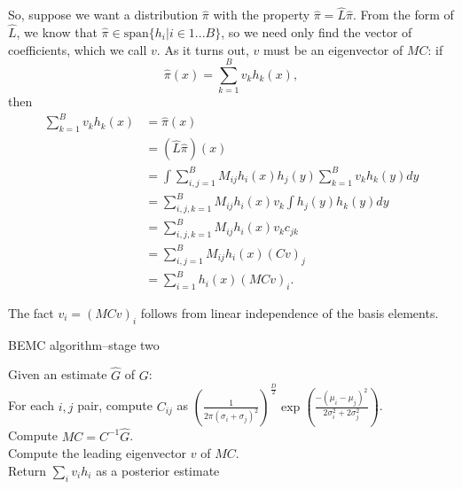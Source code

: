 \documentclass{article}
\newcommand\EMK[1]{\textcolor{purple}{EMK: #1}}
\begin{document}
So, suppose we want a distribution $\hat{\pi}$ with the property $\hat{\pi}=\hat{L}\hat{\pi}$. From the form of $\hat{L}$, we know that $\hat{\pi}\in \text{span}\{h_i|i \in 1...B\}$, so we need only find the vector of coefficients, which we call $v$. As it turns out, $v$ must be an eigenvector of $MC$: if $$\hat{\pi}(x) = \sum_{k=1}^Bv_kh_k(x),$$
then
\begin{align*}
\sum_{k=1}^Bv_kh_k(x) 
&= \hat{\pi}(x) \\
&= (\hat{L}\hat{\pi})(x) \\
&= \int \sum_{i,j=1}^B M_{ij} h_i(x)h_j(y) \sum_{k=1}^Bv_kh_k(y)dy\\
&=  \sum_{i,j,k=1}^B M_{ij} h_i(x)v_k\int h_j(y)h_k(y)dy\\
&=  \sum_{i,j,k=1}^B M_{ij} h_i(x)v_kc_{jk}\\
&=  \sum_{i,j=1}^B M_{ij} h_i(x)(Cv)_j\\
&=  \sum_{i=1}^B h_i(x)(MCv)_i.
\end{align*}

The fact $v_i = (MCv)_i$ follows from linear independence of the basis elements.



\begin{algorithm}[h]
\caption{BEMC algorithm--stage two}
Given an estimate $\hat{G}$ of $G$:\\
For each $i,j$ pair, compute $C_{ij}$ as $(\frac{1}{2\pi (\sigma_i+\sigma_j)^2})^{\frac{D}{2}}\exp(\frac{-(\mu_i-\mu_j)^2}{2\sigma_i^2+2\sigma_j^2})$.\\
Compute ${M}C=C^{-1}\hat{G}$.\\
Compute the leading eigenvector $v$ of $MC$. \\
Return $\sum_i v_i h_i$ as a posterior estimate\\
\end{algorithm}

\end{document}
